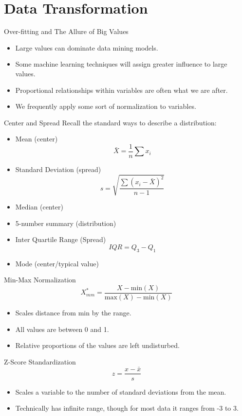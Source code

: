 \documentclass[handout]{beamer}
\begin{document}
\section{Data Transformation}
\begin{frame}{Over-fitting and The Allure of Big Values}
\begin{itemize}[<+->]
  \item Large values can dominate data mining models.
  \item Some machine learning techniques will assign greater influence to large values.
  \item Proportional relationships within variables are often what we are after.
  \item We frequently apply some sort of normalization to variables.
\end{itemize}
\end{frame}

\begin{frame}{Center and Spread}
Recall the standard ways to describe a distribution: 
\begin{itemize}[<+->]
  \item Mean (center)
  \[
  \bar{X}=\displaystyle\frac{1}{n}\sum x_i
  \]
  \item Standard Deviation (spread)
  \[
  s = \sqrt{\displaystyle\frac{\sum (x_i-\bar{X})^2}{n-1}}
  \]
  \item Median (center)
  \item 5-number summary (distribution)
  \item Inter Quartile Range (Spread)
  \[
  IQR = Q_3 - Q_1
  \]
  \item Mode (center/typical value)
\end{itemize}
\end{frame}

\begin{frame}{Min-Max Normalization}
\[
X^*_{mm} = \displaystyle\frac{X - \mathrm{min}(X)}{\mathrm{max}(X) - \mathrm{min}(X)}
\]
\begin{itemize}[<+->]
\item Scales distance from min by the range.
\item All values are between 0 and 1.
\item Relative proportions of the values are left undisturbed.
\end{itemize}
\end{frame}

\begin{frame}{Z-Score Standardization}
\[
z = \displaystyle\frac{x-\bar{x}}{s}
\]
\begin{itemize}[<+->]
  \item Scales a variable to the number of standard deviations from the mean.
  \item Technically has infinite range, though for most data it ranges from -3 to 3.
\end{itemize}
\end{frame}
\end{document}
